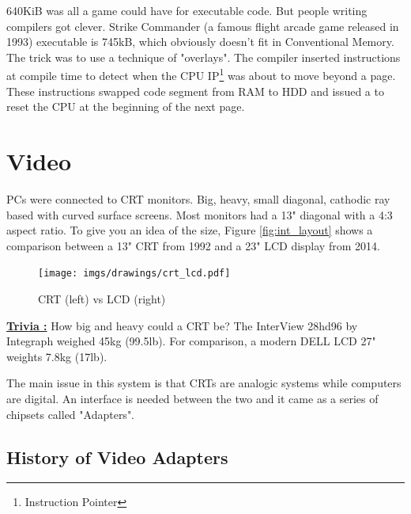 \documentclass[book.tex]{subfiles}
\begin{document}
\par
{} 640KiB was all a game could have for executable code. But people writing compilers got clever. Strike Commander (a famous flight arcade game released in 1993) executable is 745kB, which obviously doesn't fit in Conventional Memory. The trick was to use a technique of "overlays". The compiler inserted instructions at compile time to detect when the CPU IP\footnote{Instruction Pointer} was about to move beyond a page. These instructions swapped code segment from RAM to HDD and issued a  to reset the CPU at the beginning of the next page.

















\section{Video}

PCs were connected to CRT monitors. Big, heavy, small diagonal, cathodic ray based with curved surface screens. Most monitors had a 13" diagonal with a 4:3 aspect ratio. To give you an idea of the size, Figure \ref{fig:int_layout} shows a comparison between a 13" CRT from 1992 and a 23" LCD display from 2014.\\

\begin{figure}[H]
\centering
\texttt{[image: imgs/drawings/crt\_lcd.pdf]}
\caption{CRT (left) vs LCD (right)}
\label{fig:lcd_vs_crt}
\end{figure}

\textbf{\underline{Trivia :}} How big and heavy could a CRT be? The InterView 28hd96 by Integraph weighed 45kg (99.5lb). For comparison, a modern DELL LCD 27" weights 7.8kg (17lb).\\
\par
The main issue in this system is that CRTs are analogic systems while computers are digital. An interface is needed between the two and it came as a series of chipsets called "Adapters". 

  \subsection{History of Video Adapters}
\end{document}
